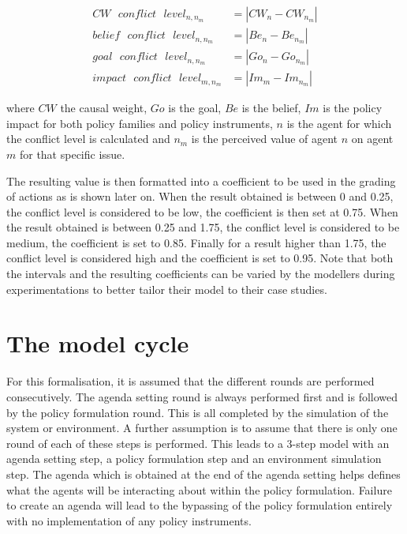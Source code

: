 \documentclass[11pt]{article}
\begin{document}
\begin{enumerate}
\begin{equation}\begin{split}
CW \text{ }conflict \text{ } level_{n,n_m} &= |CW_n - CW_{n_m}| \\
belief \text{ }conflict \text{ } level_{n,n_m} &= |Be_n - Be_{n_m}| \\
goal \text{ } conflict \text{ } level_{n,n_m} &= |Go_n - Go_{n_m}| \\
impact \text{ } conflict \text{ } level_{m,n_m} &= |Im_m - Im_{n_m}|
\end{split}\end{equation}

where $CW$ the causal weight, $Go$ is the goal, $Be$ is the belief, $Im$ is the policy impact for both policy families and policy instruments, $n$ is the agent for which the conflict level is calculated and $n_m$ is the perceived value of agent $n$ on agent $m$ for that specific issue.

The resulting value is then formatted into a coefficient to be used in the grading of actions as is shown later on. When the result obtained is between 0 and 0.25, the conflict level is considered to be low, the coefficient is then set at 0.75. When the result obtained is between 0.25 and 1.75, the conflict level is considered to be medium, the coefficient is set to 0.85. Finally for a result higher than 1.75, the conflict level is considered high and the coefficient is set to 0.95. Note that both the intervals and the resulting coefficients can be varied by the modellers during experimentations to better tailor their model to their case studies.

\end{enumerate}







\section{The model cycle}
\label{sec:modelCycle}

For this formalisation, it is assumed that the different rounds are performed consecutively. The agenda setting round is always performed first and is followed by the policy formulation round. This is all completed by the simulation of the system or environment. A further assumption is to assume that there is only one round of each of these steps is performed. This leads to a 3-step model with an agenda setting step, a policy formulation step and an environment simulation step. The agenda which is obtained at the end of the agenda setting helps defines what the agents will be interacting about within the policy formulation. Failure to create an agenda will lead to the bypassing of the policy formulation entirely with no implementation of any policy instruments.
\end{document}

